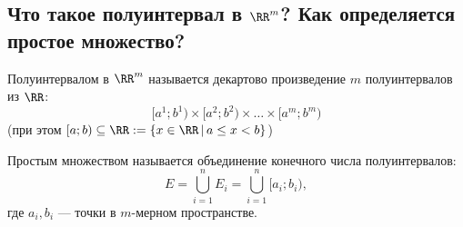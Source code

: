 
\subsection{Что такое полуинтервал в $\RR^m$? Как определяется простое множество?}

\begin{definition}
    Полуинтервалом в $\RR^m$ называется декартово произведение $m$ полуинтервалов из $\RR$:
    \[ [a^1; b^1) \times [a^2; b^2) \times \dots \times [a^m; b^m) \]
    (при этом $[a; b) \subseteq \RR := \{ x \in \RR \,|\, a \le x < b \}$)
\end{definition}

\begin{definition}
    Простым множеством называется объединение конечного числа полуинтервалов:
    \[ E = \bigcup\limits_{i=1}^{n} E_i = \bigcup\limits_{i=1}^{n} [a_i; b_i), \]
    где $a_i, b_i$ --- точки в $m$-мерном пространстве.\\
\end{definition}
    
